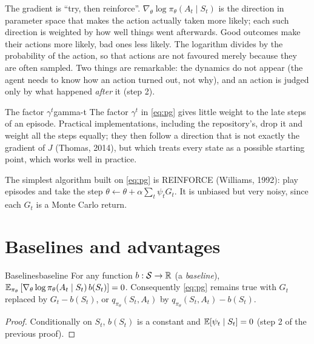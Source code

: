\begin{intuition}
  The gradient is ``try, then reinforce''. $\nabla_\theta \log
  \pi_\theta(A_t \mid S_t)$ is the direction in parameter space that makes
  the action actually taken more likely; each such direction is weighted by
  how well things went afterwards. Good outcomes make their actions more
  likely, bad ones less likely. The logarithm divides by the probability of
  the action, so that actions are not favoured merely because they are
  often sampled. Two things are remarkable: the dynamics do not appear (the
  agent needs to know how an action turned out, not why), and an action is
  judged only by what happened \emph{after} it (step 2).
\end{intuition}

\begin{remark}{The factor $\gamma^t$}{gamma-t}
  The factor $\gamma^t$ in \eqref{eq:pg} gives little weight to the late
  steps of an episode. Practical implementations, including the
  repository's, drop it and weight all the steps equally; they then follow
  a direction that is not exactly the gradient of $J$ (Thomas, 2014), but
  which treats every state as a possible starting point, which works well
  in practice.
\end{remark}

The simplest algorithm built on \eqref{eq:pg} is REINFORCE (Williams,
1992): play episodes and take the step $\theta \gets \theta + \alpha \sum_t
\psi_t G_t$. It is unbiased but very noisy, since each $G_t$ is a Monte
Carlo return.

\section{Baselines and advantages}

\begin{proposition}{Baselines}{baseline}
  For any function $b : \mathcal{S} \to \mathbb{R}$ (a \emph{baseline}),
  $\mathbb{E}_{\pi_\theta}\left[\nabla_\theta \log \pi_\theta(A_t \mid S_t)\,
  b(S_t)\right] = 0$. Consequently \eqref{eq:pg} remains true with $G_t$
  replaced by $G_t - b(S_t)$, or $q_{\pi_\theta}(S_t, A_t)$ by
  $q_{\pi_\theta}(S_t, A_t) - b(S_t)$.
\end{proposition}

\begin{proof}
  Conditionally on $S_t$, $b(S_t)$ is a constant and
  $\mathbb{E}[\psi_t \mid S_t] = 0$ (step 2 of the previous proof).
\end{proof}

